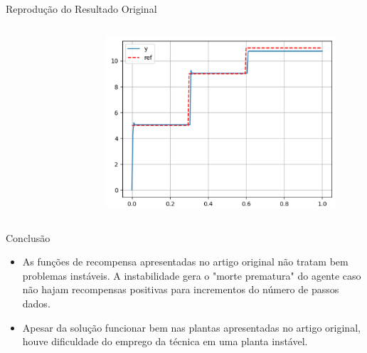 \documentclass[pdf]{beamer}
\begin{document}
\begin{frame}{Reprodução do Resultado Original}
\begin{columns}
\begin{subfigure}[t]{\textwidth}
		\end{subfigure}
		\begin{subfigure}[t]{\textwidth}
			\centering
			\includegraphics[scale=0.45]{img/result_original_mult_step.png}
		\end{subfigure}
\end{columns}
	
\end{frame}


\begin{frame}{Conclusão}
	\begin{itemize}
		\item As funções de recompensa apresentadas no artigo original não tratam bem problemas instáveis. A instabilidade gera o "morte prematura" do agente caso não hajam recompensas positivas para incrementos do número de passos dados.
		
		\item Apesar da solução funcionar bem nas plantas apresentadas no artigo original, houve dificuldade do emprego da técnica em uma planta instável.

	\end{itemize}
	
\end{frame}
\end{document}
